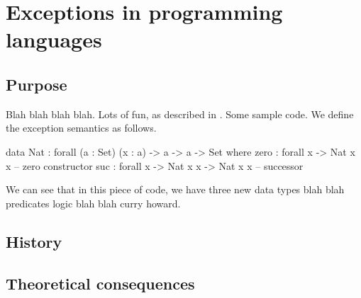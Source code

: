 \chapter{Exceptions in programming languages}

\section{Purpose}

Blah blah blah blah. Lots of fun, as described in \cite{swierstra:thesis}. Some sample code.
We define the exception semantics as follows.

\begin{code}
data Nat : forall (a : Set) (x : a) -> a -> a -> Set where
  zero : forall {x} -> Nat x x  -- zero constructor
  suc : forall {x} -> Nat x x -> Nat x x  -- successor
\end{code}

\noindent We can see that in this piece of code, we have three new data types
blah blah predicates logic blah blah curry howard.

\section{History}

\section{Theoretical consequences}

